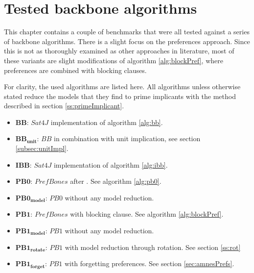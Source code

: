 \section{Tested backbone algorithms}

This chapter contains a couple of benchmarks that were all tested against a series of backbone algorithms. There is a slight focus on the preferences approach. Since this is not as thoroughly examined as other approaches in literature, most of these variants are slight modifications of algorithm \ref{alg:blockPref}, where preferences are combined with blocking clauses.

For clarity, the used algorithms are listed here. All algorithms unless otherwise stated reduce the models that they find to prime implicants with the method described in section \ref{ss:primeImplicant}.
\begin{itemize}
\setlength\itemsep{0.2em}
\item $\boldsymbol{BB}$: $Sat4J$ implementation of algorithm \ref{alg:bb}.
\item $\boldsymbol{BB_{unit}}$: $BB$ in combination with unit implication, see section \ref{subsec:unitImpl}.
\item $\boldsymbol{IBB}$: $Sat4J$ implementation of algorithm \ref{alg:ibb}.
\item $\boldsymbol{PB0}$: $PrefBones$ after \cite{PJ18}. See algorithm \ref{alg:pb0}.
\item $\boldsymbol{PB0_{model}}$: $PB0$ without any model reduction.
\item $\boldsymbol{PB1}$: $PrefBones$ with blocking clause. See algorithm \ref{alg:blockPref}.
\item $\boldsymbol{PB1_{model}}$: $PB1$ without any model reduction.
\item $\boldsymbol{PB1_{rotate}}$: $PB1$ with model reduction through rotation. See section \ref{ss:rot}
\item $\boldsymbol{PB1_{forget}}$: $PB1$ with forgetting preferences. See section \ref{sec:amnesPrefs}.

\end{itemize}
